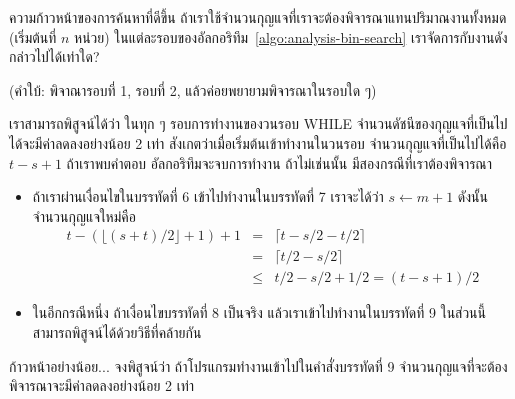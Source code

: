 \begin{quiz}{ความ{\wbr}ก้าวหน้า{\wbr}ของ{\wbr}การ{\wbr}ค้นหา{\wbr}ที่{\wbr}ดี{\wbr}ขึ้น}
ถ้า{\wbr}เรา{\wbr}ใช้{\wbr}จำนวน{\wbr}กุญแจ{\wbr}ที่{\wbr}เรา{\wbr}จะ{\wbr}ต้อง{\wbr}พิจารณา{\wbr}แทน{\wbr}ปริมาณ{\wbr}งาน{\wbr}ทั้งหมด (เริ่มต้น{\wbr}ที่ $n$ หน่วย)
ใน{\wbr}แต่ละ{\wbr}รอบ{\wbr}ของ{\wbr}อัล{\wbr}กอ{\wbr}ริ{\wbr}ทึม~\ref{algo:analysis-bin-search}
เรา{\wbr}จัดการ{\wbr}กับ{\wbr}งาน{\wbr}ดังกล่าว{\wbr}ไป{\wbr}ได้{\wbr}เท่าใด?

(คำ{\wbr}ใบ้: พิจาณารอบ{\wbr}ที่ 1, รอบ{\wbr}ที่ 2, แล้ว{\wbr}ค่อย{\wbr}พยายาม{\wbr}พิจารณา{\wbr}ใน{\wbr}รอบ{\wbr}ใด ๆ)
\end{quiz}

เรา{\wbr}สามารถ{\wbr}พิสูจน์{\wbr}ได้{\wbr}ว่า ใน{\wbr}ทุก ๆ รอบ{\wbr}การ{\wbr}ทำงาน{\wbr}ของ{\wbr}วน{\wbr}รอบ WHILE
จำนวน{\wbr}ดัชนี{\wbr}ของ{\wbr}กุญแจ{\wbr}ที่{\wbr}เป็น{\wbr}ไป{\wbr}ได้{\wbr}จะ{\wbr}มี{\wbr}ค่า{\wbr}ลด{\wbr}ลง{\wbr}อย่าง{\wbr}น้อย 2 เท่า{\wbr}
สังเกต{\wbr}ว่า{\wbr}เมื่อ{\wbr}เริ่มต้น{\wbr}เข้า{\wbr}ทำงาน{\wbr}ใน{\wbr}วน{\wbr}รอบ จำนวน{\wbr}กุญแจ{\wbr}ที่{\wbr}เป็น{\wbr}ไป{\wbr}ได้{\wbr}คือ $t - s + 1$
ถ้า{\wbr}เรา{\wbr}พบ{\wbr}คำตอบ อัล{\wbr}กอ{\wbr}ริ{\wbr}ทึม{\wbr}จะ{\wbr}จบ{\wbr}การ{\wbr}ทำงาน ถ้า{\wbr}ไม่{\wbr}เช่นนั้น มี{\wbr}สอง{\wbr}กรณี{\wbr}ที่{\wbr}เรา{\wbr}ต้อง{\wbr}พิจารณา{\wbr}
\begin{itemize}
\item ถ้า{\wbr}เรา{\wbr}ผ่าน{\wbr}เงื่อนไข{\wbr}ใน{\wbr}บรรทัด{\wbr}ที่ 6 เข้า{\wbr}ไป{\wbr}ทำงาน{\wbr}ใน{\wbr}บรรทัด{\wbr}ที่ 7 เรา{\wbr}จะ{\wbr}ได้{\wbr}ว่า{\wbr}
  $s\leftarrow m+1$ ดังนั้น{\wbr}จำนวน{\wbr}กุญแจ{\wbr}ใหม่{\wbr}คือ{\wbr}
  \begin{eqnarray*}
    t - (\lfloor (s+t)/2\rfloor + 1) + 1 
    &=& \lceil t - s/2 - t/2 \rceil\\
    &=& \lceil t/2 - s/2\rceil\\
    &\leq& t/2 - s/2 + 1/2 = (t-s+1)/2
  \end{eqnarray*}
\item ใน{\wbr}อีก{\wbr}กรณี{\wbr}หนึ่ง ถ้า{\wbr}เงื่อนไข{\wbr}บรรทัด{\wbr}ที่ 8 เป็นจริง แล้ว{\wbr}เรา{\wbr}เข้า{\wbr}ไป{\wbr}ทำงาน{\wbr}ใน{\wbr}บรรทัด{\wbr}ที่ 9
  ใน{\wbr}ส่วน{\wbr}นี้{\wbr}สามารถ{\wbr}พิสูจน์{\wbr}ได้{\wbr}ด้วย{\wbr}วิธี{\wbr}ที่{\wbr}คล้าย{\wbr}กัน{\wbr}
\end{itemize}

\begin{quiz}{ก้าวหน้า{\wbr}อย่าง{\wbr}น้อย...}
จง{\wbr}พิสูจน์{\wbr}ว่า ถ้า{\wbr}โปรแกรม{\wbr}ทำงาน{\wbr}เข้า{\wbr}ไป{\wbr}ใน{\wbr}คำสั่ง{\wbr}บรรทัด{\wbr}ที่ 9
จำนวน{\wbr}กุญแจ{\wbr}ที่{\wbr}จะ{\wbr}ต้อง{\wbr}พิจารณา{\wbr}จะ{\wbr}มี{\wbr}ค่า{\wbr}ลด{\wbr}ลง{\wbr}อย่าง{\wbr}น้อย 2 เท่า{\wbr}
\end{quiz}


